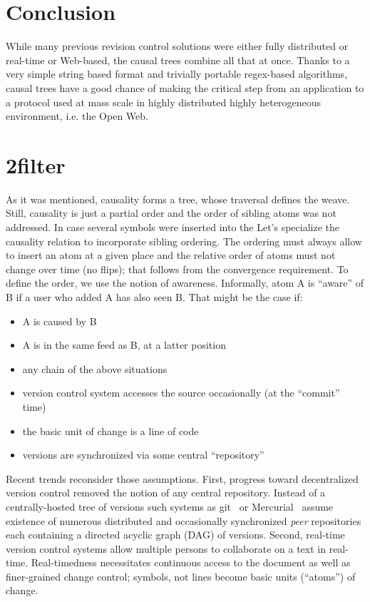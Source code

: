 \documentclass{acm_proc_article-sp}
\begin{document}
\section {Conclusion}

While many previous revision control solutions were either
fully distributed or real-time or Web-based, the causal trees
combine all that at once. Thanks to a very simple string based
format and trivially portable regex-based algorithms, causal trees
have a good chance of making the critical step from an
application to a protocol used at mass scale in highly
distributed highly heterogeneous environment, i.e. the Open Web.


\section{2filter}

As it was mentioned, causality forms a tree, whose traversal
defines the weave. Still, causality is just a partial order
and the order of sibling atoms was not addressed. In case
several symbols were inserted into the 
Let's specialize the causality relation to incorporate sibling
ordering.
The ordering must always allow to insert an atom at a given
place and the relative order of atoms must not change over time
(no flips); that follows from the convergence requirement.
To define the order, we use the notion of awareness. 
   Informally, atom A is ``aware'' of B if a user who added A has
   also seen B. That might be the case if:
   \begin{itemize}
     \item A is caused by B
     \item A is in the same feed as B, at a latter position
     \item any chain of the above situations
   \end{itemize}




\begin{itemize}
\item version control system accesses the source occasionally (at the ``commit'' time)
\item the basic unit of change is a line of code
\item versions are synchronized via some central ``repository''
\end{itemize}
Recent trends reconsider those assumptions.
First, progress toward decentralized version control removed the notion of any central repository. Instead of a centrally-hosted tree of versions such systems as git~\cite{git} or Mercurial~\cite{mercurial} assume existence of numerous distributed and occasionally synchronized \emph{peer} repositories each containing a directed acyclic graph (DAG) of versions.
Second, real-time version control systems allow multiple persons to collaborate on a text in real-time. Real-timedness necessitates continuous access to the document as well as finer-grained change control;  symbols, not lines become basic units (``atoms'') of change.
\end{document}
